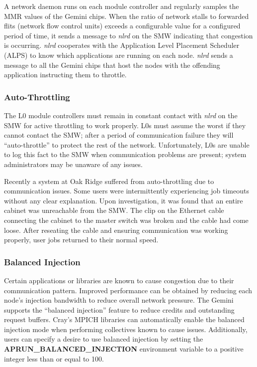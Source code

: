 \documentclass[10pt, conference, compsocconf]{IEEEtran}
\begin{document}
A network daemon runs on each module controller and regularly samples the MMR
values of the Gemini chips.  When the ratio of network stalls to forwarded
flits (network flow control units) exceeds a configurable value for a
configured period of time, it sends a message to \emph{nlrd} on the SMW indicating
that congestion is occurring.  \emph{nlrd} cooperates with the Application Level
Placement Scheduler (ALPS) to know which applications are running on each node.
\emph{nlrd} sends a message to all the Gemini chips that host the nodes with the
offending application instructing them to throttle.

\subsubsection{Auto-Throttling}

The L0 module controllers must remain in constant contact with \emph{nlrd} on
the SMW for active throttling to work properly.  L0s must assume the worst if
they cannot contact the SMW; after a period of communication failure they will
``auto-throttle'' to protect the rest of the network.  Unfortunately, L0s are
unable to log this fact to the SMW when communication problems are present;
system administrators may be unaware of any issues.

Recently a system at Oak Ridge suffered from auto-throttling due to
communication issues.  Some users were intermittently experiencing job timeouts
without any clear explanation.  Upon investigation, it was found that an entire
cabinet was unreachable from the SMW.  The clip on the Ethernet cable
connecting the cabinet to the master switch was broken and the cable had come
loose.  After reseating the cable and ensuring communication was working
properly, user jobs returned to their normal speed.

\subsubsection{Balanced Injection}

\label{sec:bi}

Certain applications or libraries are known to cause congestion due to their
communication pattern.  Improved performance can be obtained by reducing each
node's injection bandwidth to reduce overall network pressure.  The Gemini
supports the ``balanced injection'' feature to reduce credits and outstanding
request buffers.  Cray's MPICH libraries can automatically enable the balanced
injection mode when performing collectives known to cause issues.
Additionally, users can specify a desire to use balanced injection by setting
the \textbf{APRUN\_BALANCED\_INJECTION} environment variable to a positive
integer less than or equal to 100.
\end{document}

